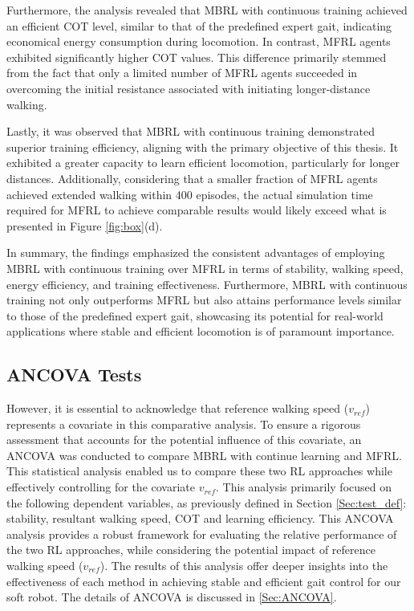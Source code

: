 Furthermore, the analysis revealed that MBRL with continuous training achieved an efficient COT level, similar to that of the predefined expert gait, indicating economical energy consumption during locomotion. In contrast, MFRL agents exhibited significantly higher COT values. This difference primarily stemmed from the fact that only a limited number of MFRL agents succeeded in overcoming the initial resistance associated with initiating longer-distance walking. 

Lastly, it was observed that MBRL with continuous training demonstrated superior training efficiency, aligning with the primary objective of this thesis. It exhibited a greater capacity to learn efficient locomotion, particularly for longer distances. Additionally, considering that a smaller fraction of MFRL agents achieved extended walking within 400 episodes, the actual simulation time required for MFRL to achieve comparable results would likely exceed what is presented in Figure \ref{fig:box}(d).

In summary, the findings emphasized the consistent advantages of employing MBRL with continuous training over MFRL in terms of stability, walking speed, energy efficiency, and training effectiveness. Furthermore, MBRL with continuous training not only outperforms MFRL but also attains performance levels similar to those of the predefined expert gait, showcasing its potential for real-world applications where stable and efficient locomotion is of paramount importance.

\subsection{ANCOVA Tests}
However, it is essential to acknowledge that reference walking speed ($v_{ref}$) represents a covariate in this comparative analysis. To ensure a rigorous assessment that accounts for the potential influence of this covariate, an \ac{ANCOVA} was conducted to compare MBRL with continue learning and MFRL. This statistical analysis enabled us to compare these two RL approaches while effectively controlling for the covariate $v_{ref}$. This analysis primarily focused on the following dependent variables, as previously defined in Section \ref{Sec:test_def}: stability, resultant walking speed, COT and learning efficiency. This ANCOVA analysis provides a robust framework for evaluating the relative performance of the two RL approaches, while considering the potential impact of reference walking speed ($v_{ref}$). The results of this analysis offer deeper insights into the effectiveness of each method in achieving stable and efficient gait control for our soft robot. The details of ANCOVA is discussed in \ref{Sec:ANCOVA}.

